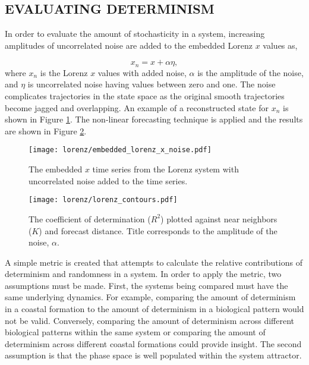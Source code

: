 \subsection{EVALUATING DETERMINISM}

In order to evaluate the amount of stochasticity in a system, increasing amplitudes of uncorrelated noise are added to the embedded Lorenz $x$ values as,

$$x_n = x + \alpha\eta,$$
where $x_n$ is the Lorenz $x$ values with added noise, $\alpha$ is the amplitude of the noise, and $\eta$ is uncorrelated noise having values between zero and one. The noise complicates trajectories in the state space as the original smooth trajectories become jagged and overlapping. An example of a reconstructed state for $x_n$ is shown in Figure \ref{rebuilt_noise}. The non-linear forecasting technique is applied and the results are shown in Figure \ref{lorenz_metric_contour}. 

\begin{figure}[htbp]  %
   \centering
   \texttt{[image: lorenz/embedded\_lorenz\_x\_noise.pdf]} 
   \caption{The embedded $x$ time series from the Lorenz system with uncorrelated noise added to the time series. }
   \label{rebuilt_noise}
\end{figure}

\begin{figure}[htbp]  %
   \centering
   \texttt{[image: lorenz/lorenz\_contours.pdf]} 
   \caption{The coefficient of determination ($R^2$) plotted against near neighbors ($K$) and forecast distance. Title corresponds to the amplitude of the noise, $\alpha$. }
   \label{lorenz_metric_contour}
\end{figure}



A simple metric is created that attempts to calculate the relative contributions of determinism and randomness in a system. In order to apply the metric, two assumptions must be made. First, the systems being compared must have the same underlying dynamics. For example, comparing the amount of determinism in a coastal formation to the amount of determinism in a biological pattern would not be valid. Conversely, comparing the amount of determinism across different biological patterns within the same system or comparing the amount of determinism across different coastal formations could provide insight. The second assumption is that the phase space is well populated within the system attractor.

